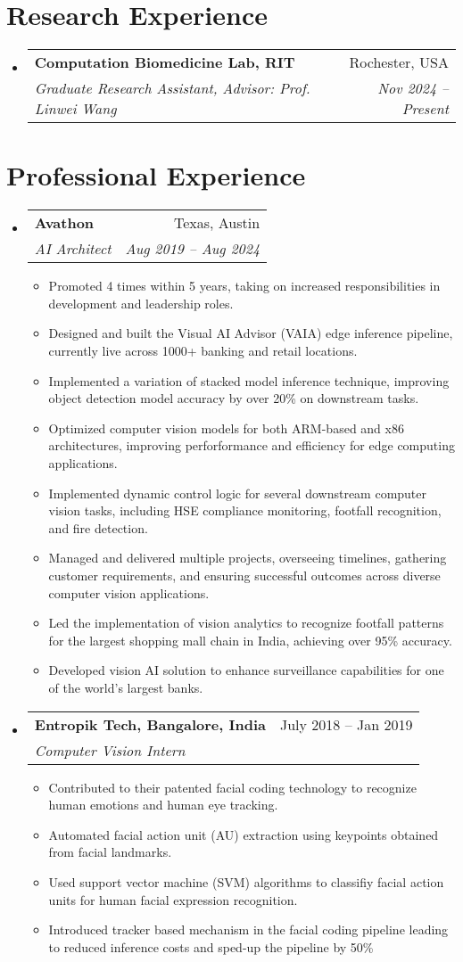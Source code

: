 \documentclass[letterpaper,10pt]{article}
\makeatletter
\newcommand{\resumeItem}[1]{
  \item\small{
    {#1 \vspace{-2pt}}
  }
}
\newcommand{\resumeSubheading}[4]{
  \vspace{-2pt}\item
    \begin{tabular*}{0.97\textwidth}[t]{l@{\extracolsep{\fill}}r}
      \textbf{#1} & #2 \\
      \textit{\small#3} & \textit{\small #4} \\
    \end{tabular*}\vspace{-7pt}
}
\newcommand{\resumeSubHeadingListStart}{\begin{itemize}[leftmargin=0.15in, label={}]}
\newcommand{\resumeSubHeadingListEnd}{\end{itemize}}
\newcommand{\resumeItemListStart}{\begin{itemize}}
\newcommand{\resumeItemListEnd}{\end{itemize}\vspace{-5pt}}
\makeatother
\begin{document}
\section{Research Experience}
  \resumeSubHeadingListStart
    \resumeSubheading
        {Computation Biomedicine Lab, RIT}{Rochester, USA}
        {Graduate Research Assistant, Advisor: Prof. Linwei Wang}{Nov 2024 -- Present}  
  \resumeSubHeadingListEnd

\section{Professional Experience}
  \resumeSubHeadingListStart
    \resumeSubheading
      {Avathon}{Texas, Austin}
      {AI Architect}{Aug 2019 -- Aug 2024}
      \resumeItemListStart
        \resumeItem{Promoted 4 times within 5 years, taking on increased responsibilities in development and leadership roles.}
        \resumeItem{Designed and built the Visual AI Advisor (VAIA) edge inference pipeline, currently live across 1000+ banking and retail locations.}
        \resumeItem{Implemented a variation of stacked model inference technique, improving object detection model accuracy by over 20\% on downstream tasks.}
        \resumeItem{Optimized computer vision models for both ARM-based and x86 architectures, improving perforformance and efficiency for edge computing applications.}
        \resumeItem{Implemented dynamic control logic for several downstream computer vision tasks, including HSE compliance monitoring, footfall recognition, and fire detection.}
        \resumeItem{Managed and delivered multiple projects, overseeing timelines, gathering customer requirements, and ensuring successful outcomes across diverse computer vision applications.}
        \resumeItem{Led the implementation of vision analytics to recognize footfall patterns for the largest shopping mall chain in India, achieving over 95\% accuracy.}
        \resumeItem{Developed vision AI solution to enhance surveillance capabilities for one of the world's largest banks.}
      \resumeItemListEnd

      \resumeSubheading
      {Entropik Tech, Bangalore, India}{July 2018 -- Jan 2019} 
      {Computer Vision Intern}{}
      \resumeItemListStart
        \resumeItem{Contributed to their patented facial coding technology to recognize human emotions and human eye tracking.}
        \resumeItem{Automated facial action unit (AU) extraction using keypoints obtained from facial landmarks.}
        \resumeItem{Used support vector machine (SVM) algorithms to classifiy facial action units for human facial expression recognition.}
        \resumeItem{Introduced tracker based mechanism in the facial coding pipeline leading to reduced inference costs and sped-up the pipeline by 50\%}
      \resumeItemListEnd
  \resumeSubHeadingListEnd
\end{document}
